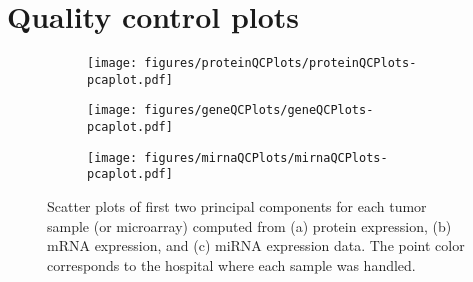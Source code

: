 


\section{Quality control plots\label{app:qc-plots}}


\begin{figure}[!h]
	\centering
	\begin{subfigure}{.7\textwidth}
		\centering
		\texttt{[image: figures/proteinQCPlots/proteinQCPlots-pcaplot.pdf]}
	\end{subfigure}
	\begin{subfigure}{.48\textwidth}
		\centering
		\texttt{[image: figures/geneQCPlots/geneQCPlots-pcaplot.pdf]}
	\end{subfigure}
	\begin{subfigure}{.48\textwidth}
		\centering
		\texttt{[image: figures/mirnaQCPlots/mirnaQCPlots-pcaplot.pdf]}
	\end{subfigure}

	\caption{Scatter plots of first two principal components for each tumor sample (or microarray)
	computed from (a) protein expression, (b) mRNA expression, and (c) miRNA expression data.
	The point color corresponds to the hospital where each sample was handled.}
	\label{fig:qc-pca}
\end{figure}


